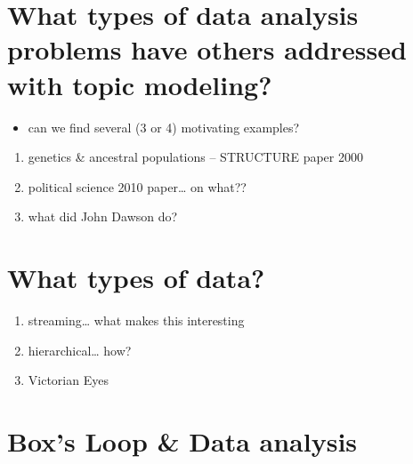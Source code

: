 \documentclass[12pt,]{article}
\providecommand{\tightlist}{%
  \setlength{\itemsep}{0pt}\setlength{\parskip}{0pt}}
\begin{document}
\section{What types of data analysis problems have others addressed with
topic
modeling?}\label{what-types-of-data-analysis-problems-have-others-addressed-with-topic-modeling}

\begin{itemize}
\tightlist
\item
  can we find several (3 or 4) motivating examples?
\end{itemize}

\begin{enumerate}
\def\labelenumi{\arabic{enumi}.}
\tightlist
\item
  genetics \& ancestral populations -- STRUCTURE paper 2000
\item
  political science 2010 paper\ldots{} on what??
\item
  what did John Dawson do?
\end{enumerate}

\section{What types of data?}\label{what-types-of-data}

\begin{enumerate}
\def\labelenumi{\arabic{enumi}.}
\tightlist
\item
  streaming\ldots{} what makes this interesting
\item
  hierarchical\ldots{} how?
\item
  Victorian Eyes
\end{enumerate}

\section{Box's Loop \& Data analysis}\label{boxs-loop-data-analysis}
\end{document}
